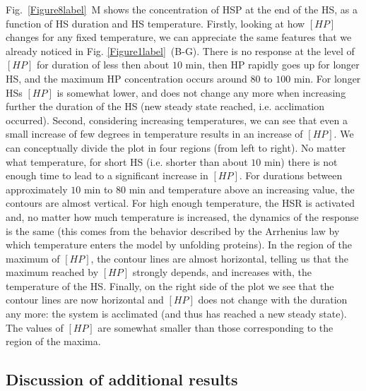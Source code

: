 \documentclass[oneside, 10pt, a4paper, twocolumn]{article}
\begin{document}
Fig.~\ref{Figure8label}~M shows the concentration of HSP at the end of the HS, as a function of HS duration and HS temperature. Firstly, looking at how $\left[HP\right]$ changes for any fixed temperature, we can appreciate the same features that we already noticed in Fig. \ref{Figure1label}~(B-G). There is no response at the level of $\left[HP\right]$ for duration of less then about $10$ min, then HP rapidly goes up for longer HS, and the maximum HP concentration occurs around $80$ to $100$ min. For longer HSs $\left[HP\right]$ is somewhat lower, and does not change any more when increasing further the duration of the HS (new steady state reached, i.e. acclimation occurred).
Second, considering increasing temperatures, we can see that even a small increase of few degrees in temperature results in an increase of $\left[HP\right]$. %
We can conceptually divide the plot in four regions (from left to right). No matter what temperature, for short HS (i.e. shorter than about $10$ min) there is not enough time to lead to a significant increase in $\left[HP\right]$. For durations between approximately $10$ min to $80$ min and temperature above an increasing value, the contours are almost vertical. For high enough temperature, the HSR is activated and, no matter how much temperature is increased, the dynamics of the response is the same (this comes from the behavior described by the Arrhenius law  by which temperature enters the model by unfolding proteins). In the region of the maximum of $\left[HP\right]$, the contour lines are almost horizontal, telling us that the maximum reached by $\left[HP\right]$ strongly depends, and increases with, the temperature of the HS. Finally, on the right side of the plot we see that the contour lines are now horizontal and $\left[HP\right]$ does not change with the duration any more: the system is acclimated (and thus has reached a new steady state). The values of $\left[HP\right]$ are somewhat smaller than those corresponding to the region of the maxima.


\subsection{Discussion of additional results}
\end{document}

